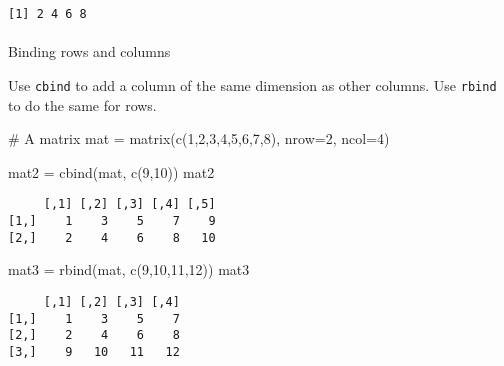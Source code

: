 \documentclass[
  letterpaper,
  DIV=11,
  numbers=noendperiod]{scrartcl}
\makeatletter
\let\oldparagraph\paragraph
\renewcommand{\paragraph}{
    \@ifstar
      \xxxParagraphStar
      \xxxParagraphNoStar
  }
\newcommand{\xxxParagraphStar}[1]{\oldparagraph*{#1}\mbox{}}
\newcommand{\xxxParagraphNoStar}[1]{\oldparagraph{#1}\mbox{}}
\newenvironment{Shaded}{\begin{snugshade}}{\end{snugshade}}
\newcommand{\AttributeTok}[1]{\textcolor[rgb]{0.40,0.45,0.13}{#1}}
\newcommand{\CommentTok}[1]{\textcolor[rgb]{0.37,0.37,0.37}{#1}}
\newcommand{\DecValTok}[1]{\textcolor[rgb]{0.68,0.00,0.00}{#1}}
\newcommand{\FunctionTok}[1]{\textcolor[rgb]{0.28,0.35,0.67}{#1}}
\newcommand{\NormalTok}[1]{\textcolor[rgb]{0.00,0.23,0.31}{#1}}
\newcommand{\OtherTok}[1]{\textcolor[rgb]{0.00,0.23,0.31}{#1}}
\makeatother
\begin{document}
\begin{verbatim}
[1] 2 4 6 8
\end{verbatim}

\paragraph{Binding rows and columns}\label{binding-rows-and-columns}

Use \texttt{cbind} to add a column of the same dimension as other
columns. Use \texttt{rbind} to do the same for rows.

\begin{Shaded}
\begin{Highlighting}[]
\CommentTok{\# A matrix}
\NormalTok{mat }\OtherTok{=} \FunctionTok{matrix}\NormalTok{(}\FunctionTok{c}\NormalTok{(}\DecValTok{1}\NormalTok{,}\DecValTok{2}\NormalTok{,}\DecValTok{3}\NormalTok{,}\DecValTok{4}\NormalTok{,}\DecValTok{5}\NormalTok{,}\DecValTok{6}\NormalTok{,}\DecValTok{7}\NormalTok{,}\DecValTok{8}\NormalTok{),}
             \AttributeTok{nrow=}\DecValTok{2}\NormalTok{,}
             \AttributeTok{ncol=}\DecValTok{4}\NormalTok{)}

\NormalTok{mat2 }\OtherTok{=} \FunctionTok{cbind}\NormalTok{(mat, }\FunctionTok{c}\NormalTok{(}\DecValTok{9}\NormalTok{,}\DecValTok{10}\NormalTok{))}
\NormalTok{mat2}
\end{Highlighting}
\end{Shaded}

\begin{verbatim}
     [,1] [,2] [,3] [,4] [,5]
[1,]    1    3    5    7    9
[2,]    2    4    6    8   10
\end{verbatim}

\begin{Shaded}
\begin{Highlighting}[]
\NormalTok{mat3 }\OtherTok{=} \FunctionTok{rbind}\NormalTok{(mat, }\FunctionTok{c}\NormalTok{(}\DecValTok{9}\NormalTok{,}\DecValTok{10}\NormalTok{,}\DecValTok{11}\NormalTok{,}\DecValTok{12}\NormalTok{))}
\NormalTok{mat3}
\end{Highlighting}
\end{Shaded}

\begin{verbatim}
     [,1] [,2] [,3] [,4]
[1,]    1    3    5    7
[2,]    2    4    6    8
[3,]    9   10   11   12
\end{verbatim}
\end{document}
